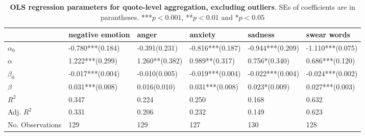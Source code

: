 \begin{table}[h]\centering
\caption{\textbf{OLS regression parameters for  quote-level aggregation, excluding outliers}. SEs of coefficients are in parantheses. ***$p < 0.001$, **$p < 0.01$ and *$p < 0.05$}
	\label{fig: Quotation_2}
\begin{adjustbox}{width=\linewidth, center}
	\begin{tabular}{llllll}
	\toprule
	{} &            negative emotion &                                                     anger &                               anxiety &                                         sadness &                 swear words \\
	\midrule
	$\alpha_0$       &            -0.780***(0.184) &            -0.391\phantom{*}\phantom{*}\phantom{*}(0.231) &                      -0.816***(0.187) &                                -0.944***(0.209) &            -1.110***(0.075) \\
	$\alpha$         &  \phantom{-}1.222***(0.299) &                      \phantom{-}1.260**\phantom{*}(0.382) &  \phantom{-}0.989**\phantom{*}(0.317) &  \phantom{-}0.756*\phantom{*}\phantom{*}(0.340) &  \phantom{-}0.686***(0.120) \\
	$\beta_0$        &            -0.017***(0.004) &            -0.010\phantom{*}\phantom{*}\phantom{*}(0.005) &                      -0.019***(0.004) &                                -0.022***(0.004) &            -0.024***(0.002) \\
	$\beta$          &  \phantom{-}0.031***(0.008) &  \phantom{-}0.016\phantom{*}\phantom{*}\phantom{*}(0.010) &            \phantom{-}0.031***(0.008) &  \phantom{-}0.023*\phantom{*}\phantom{*}(0.009) &  \phantom{-}0.027***(0.003) \\
	$R^2$            &                       0.347 &                                                     0.224 &                                 0.250 &                                           0.168 &                       0.632 \\
	Adj. $R^2$       &                       0.331 &                                                     0.206 &                                 0.232 &                                           0.149 &                       0.623 \\
	No. Observations &                         129 &                                                       129 &                                   127 &                                             130 &                         128 \\
	\bottomrule
	\end{tabular}
	
\end{adjustbox}
	\end{table}

